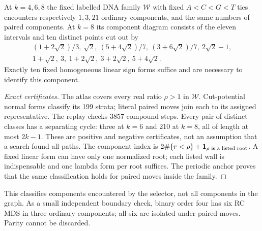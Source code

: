 \begin{proposition}
\label{prop:family-components}
At $k=4,6,8$ the fixed labelled DNA family $\mathcal W$ with fixed $A<C<G<T$ ties encounters respectively
$1,3,21$ ordinary components, and the same numbers of paired
components. At $k=8$ its component diagram consists of the eleven
intervals and ten distinct points cut out by
\[
\begin{gathered}
 (1+2\sqrt2)/3,\ \sqrt2,\ (5+4\sqrt2)/7,\ (3+6\sqrt2)/7,\
 2\sqrt2-1,\\
 1+\sqrt2,\ 3,\ 1+2\sqrt2,\ 3+2\sqrt2,\ 5+4\sqrt2 .
\end{gathered}
\]
Exactly ten fixed homogeneous linear sign forms suffice and are
necessary to identify this component.
\end{proposition}
\begin{proof}[Exact certificates]
The atlas covers every real ratio $\rho>1$ in $\mathcal W$. Cut-potential normal forms
classify its 199 strata; literal paired moves join each to its
assigned representative. The replay checks 3857 compound steps.
Every pair of distinct classes has a separating cycle: three at
$k=6$ and 210 at $k=8$, all of length at most $2k-1$.
These are positive and negative certificates, not an assumption
that a search found all paths. The component index is
$2\#\{r<\rho\}+\mathbf 1_{\rho\text{ is a listed root}}$.
A fixed linear form can have only one normalized root;
each listed wall is indispensable and one lambda form per root
suffices. The periodic anchor proves that the same classification
holds for paired moves inside the family.
\end{proof}
This classifies components encountered by the selector, not all
components in the graph. As a small independent boundary check,
binary order four has six RC MDS in three ordinary components;
all six are isolated under paired moves. Parity cannot be discarded.
